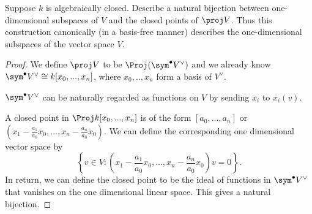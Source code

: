 \begin{exr}
Suppose $k$ is algebraically closed. Describe a natural bijection between one-dimensional subspaces of $V$ and the closed points of $\proj V$. Thus this construction canonically (in a basis-free manner) describes the one-dimensional subspaces of the vector space $V$.
\end{exr}
\begin{proof}
We define $\proj V$ to be $\Proj (\sym^\bullet V^\vee)$ and we already know $\sym^\bullet V^\vee\cong k[x_0,...,x_n]$, where $x_0,..,x_n$ form a basis  of $V^\vee$.

$\sym^\bullet V^\vee$ can be naturally regarded as functions on $V$ by sending $x_i$ to $x_i(v)$.

A closed point in $\Proj k[x_0,...,x_n]$ is of the form $[a_0,...,a_n]$ or $\left(x_1-\frac{a_1}{a_0}x_0,...,x_n-\frac{a_n}{a_0}x_0\right)$. We can define the corresponding one dimensional vector space by 
$$
\left\{v\in V: \left(x_1-\frac{a_1}{a_0}x_0,...,x_n-\frac{a_n}{a_0}x_0\right)v=0\right\}.
$$
In return, we can define the closed point to be the ideal of functions in $\sym^\bullet V^\vee$ that vanishes on the one dimensional linear space.
This gives a natural bijection.
\end{proof}